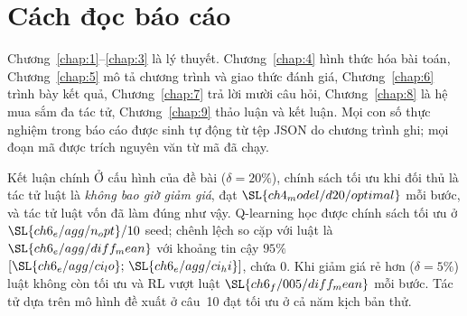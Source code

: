 \section*{Cách đọc báo cáo}
Chương~\ref{chap:1}--\ref{chap:3} là lý thuyết. Chương~\ref{chap:4} hình thức hóa bài toán, Chương~\ref{chap:5} mô tả
chương trình và giao thức đánh giá, Chương~\ref{chap:6} trình bày kết quả, Chương~\ref{chap:7} trả lời mười câu hỏi,
Chương~\ref{chap:8} là hệ mua sắm đa tác tử, Chương~\ref{chap:9} thảo luận và kết luận. Mọi con số thực nghiệm trong báo
cáo được sinh tự động từ tệp JSON do chương trình ghi; mọi đoạn mã được trích nguyên văn từ mã đã chạy.

\begin{phathien}{Kết luận chính}
Ở cấu hình của đề bài ($\delta=20\%$), chính sách tối ưu khi đối thủ là tác tử luật là \emph{không bao giờ giảm giá}, đạt
$\SL{ch4_model/d20/optimal}$ mỗi bước, và tác tử luật vốn đã làm đúng như vậy. Q-learning học được chính sách tối ưu ở
$\SL{ch6_e/agg/n_opt}/10$ seed; chênh lệch so cặp với luật là $\SL{ch6_e/agg/diff_mean}$ với khoảng tin cậy $95\%$
$[\SL{ch6_e/agg/ci_lo};\,\SL{ch6_e/agg/ci_hi}]$, chứa $0$. Khi giảm giá rẻ hơn ($\delta=5\%$) luật không còn tối ưu và RL
vượt luật $\SL{ch6_f/005/diff_mean}$ mỗi bước. Tác tử dựa trên mô hình đề xuất ở câu~10 đạt tối ưu ở cả năm kịch bản thử.
\end{phathien}
